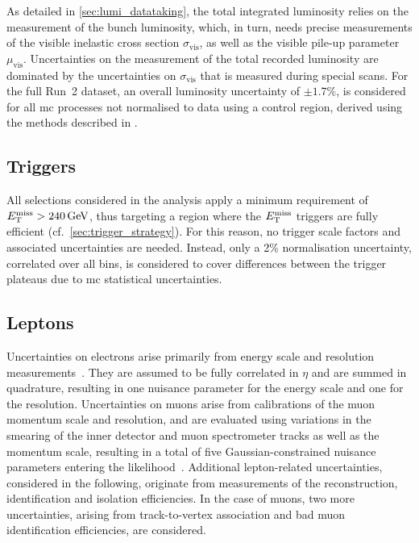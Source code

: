 As detailed in \cref{sec:lumi_datataking}, the total integrated luminosity relies on the measurement of the bunch luminosity, which, in turn, needs precise measurements of the visible inelastic cross section $\sigma_\mathrm{vis}$, as well as the visible pile-up parameter $\mu_\mathrm{vis}$.
Uncertainties on the measurement of the total recorded luminosity are dominated by the uncertainties on $\sigma_\mathrm{vis}$ that is measured during special  scans.
For the full Run~2 dataset, an overall luminosity uncertainty of $\pm 1.7\%$, is considered for all \gls{mc} processes not normalised to data using a control region, derived using the methods described in \cite{ATLAS-CONF-2019-021}.

\subsection{Triggers}

All selections considered in the analysis apply a minimum requirement of $\etmiss > \SI{240}{\GeV}$, thus targeting a region where the $E_{\textrm{T}}^{\textrm{miss}}$ triggers are fully efficient (cf.~\cref{sec:trigger_strategy}). For this reason, no trigger scale factors and associated uncertainties are needed. Instead, only a 2\% normalisation uncertainty, correlated over all bins, is considered to cover differences between the trigger plateaus due to \gls{mc} statistical uncertainties. 

\subsection{Leptons}

Uncertainties on electrons arise primarily from energy scale and resolution measurements~\cite{EGAM-2018-01,PERF-2017-01}.
They are assumed to be fully correlated in $\eta$ and are summed in quadrature, resulting in one nuisance parameter for the energy scale and one for the resolution.
Uncertainties on muons arise from calibrations of the muon momentum scale and resolution, and are evaluated using variations in the smearing of the inner detector and muon spectrometer tracks as well as the momentum scale, resulting in a total of five Gaussian-constrained nuisance parameters entering the likelihood~\cite{PERF-2015-10}.
Additional lepton-related uncertainties, considered in the following, originate from measurements of the reconstruction, identification and isolation efficiencies. In the case of muons, two more uncertainties, arising from track-to-vertex association and bad muon identification efficiencies, are considered.

